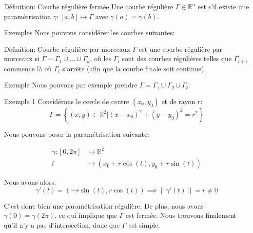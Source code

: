 \documentclass[a4paper]{article}
\begin{document}
\begin{parag}{Définition: Courbe régulière fermée}
    Une courbe régulière $\Gamma \in \mathbb{R}^n$ est  s'il existe une paramétrisation $\gamma : \left[a, b\right] \mapsto \Gamma$ avec $\gamma\left(a\right) = \gamma\left(b\right)$.
\end{parag}

\begin{parag}{Exemples}
    Nous pouvons considérer les courbes suivantes:
\end{parag}

\begin{parag}{Définition: Courbe régulière par morceaux}
    $\Gamma$ est une courbe régulière par morceaux si $\Gamma = \Gamma_1 \cup \ldots \cup \Gamma_k$, où les $\Gamma_i$ sont des courbes régulières telles que $\Gamma_{i+1}$ commence là où $\Gamma_i$ s'arrête (afin que la courbe finale soit continue).

    \begin{subparag}{Exemple}
        Nous pouvons par exemple prendre $\Gamma = \Gamma_1 \cup \Gamma_2 \cup \Gamma_3$: 
    \end{subparag}
    
\end{parag}

\begin{parag}{Exemple 1}
    Considérons le cercle de centre $\left(x_0, y_0\right)$ et de rayon $r$: 
    \[\Gamma = \left\{\left(x, y\right) \in \mathbb{R}^2 | \left(x - x_0\right)^2 + \left(y - y_0\right)^2 = r^2\right\}\]

    Nous pouvons poser la paramétrisation suivante:
    
    \[\begin{split}
    \gamma: \left[0, 2\pi\right] &\longmapsto \mathbb{R}^2 \\
    t &\longmapsto \left(x_0 + r\cos\left(t\right), y_0 + r\sin\left(t\right)\right)
    \end{split}\]

    Nous avons alors: 
    \[\gamma'\left(t\right) = \left(-r\sin\left(t\right), r\cos\left(t\right)\right) \implies \left\|\gamma'\left(t\right)\right\| = r \neq 0\]
    
    C'est donc bien une paramétrisation régulière. De plus, nous avons $\gamma\left(0\right) = \gamma\left(2\pi\right)$, ce qui implique que $\Gamma$ est fermée. Nous trouvons finalement qu'il n'y a pas d'intersection, donc que $\Gamma$ est simple.
\end{parag}
\end{document}

